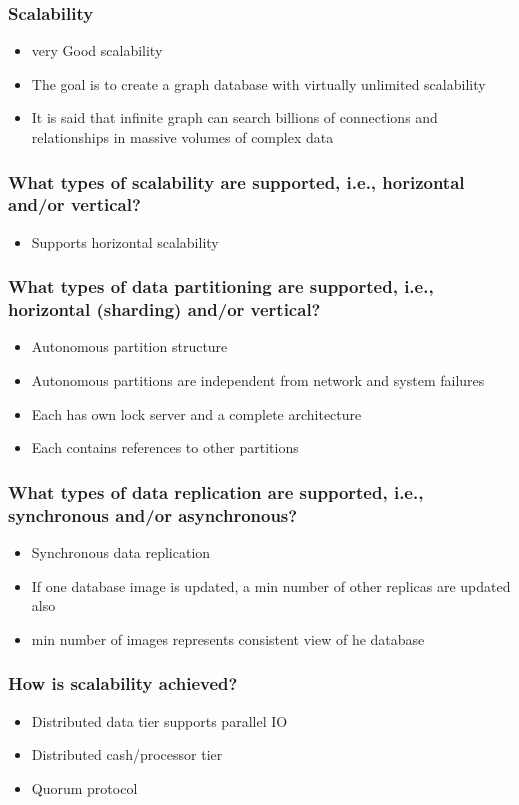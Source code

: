 
\begin{frame}
\frametitle{Scalability}
\begin{itemize}
  \item very Good scalability
         \item The goal is to create a graph database with virtually unlimited scalability
         \item It is said that infinite graph can search billions of connections and relationships in massive volumes of complex data
\end{itemize}
\end{frame} 


\begin{frame}
\frametitle{What types of scalability are supported, i.e., horizontal and/or vertical?}
\begin{itemize}
	\item Supports horizontal scalability
\end{itemize}
\end{frame} 

\begin{frame}
\frametitle{What types of data partitioning are supported, i.e., horizontal (sharding) and/or vertical?}
\begin{itemize}
	\item Autonomous partition structure	
	\item Autonomous partitions are independent from network and system failures
	\item Each has own lock server and a complete architecture
	\item Each contains references to other partitions
\end{itemize}
\end{frame} 

\begin{frame}
\frametitle{What types of data replication are supported, i.e., synchronous and/or asynchronous?}
\begin{itemize}
	\item Synchronous data replication
	\item If one database image is updated, a min number of other replicas are updated also
	\item min number of images represents consistent view of he database
\end{itemize}
\end{frame} 

\begin{frame}
\frametitle{How is scalability achieved?}
\begin{itemize}
	\item Distributed data tier supports parallel IO
	\item Distributed cash/processor tier
         \item Quorum protocol
\end{itemize}
\end{frame} 

